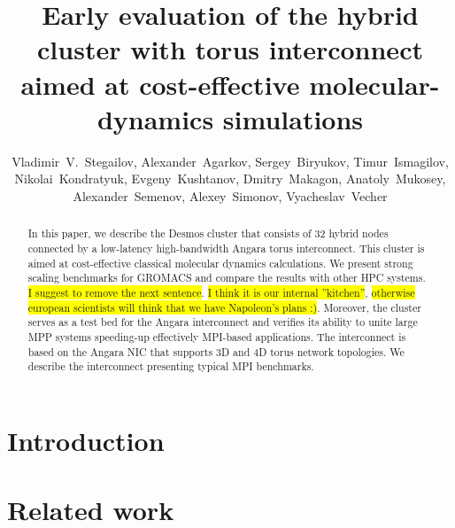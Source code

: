 \documentclass{llncs}
\begin{document}
\title{Early evaluation of the hybrid cluster with torus interconnect aimed at cost-effective molecular-dynamics simulations}

\author{%
Vladimir~V.~Stegailov,
Alexander~Agarkov,
Sergey~Biryukov,
Timur~Ismagilov,
Nikolai~Kondratyuk,
Evgeny~Kushtanov,
Dmitry~Makagon,
Anatoly~Mukosey,
Alexander~Semenov,
Alexey~Simonov,
Vyacheslav~Vecher
}
%
%

\maketitle

\begin{abstract}
In this paper, we describe the Desmos cluster that consists of 32 hybrid nodes connected by a low-latency high-bandwidth Angara torus interconnect. This cluster is aimed at cost-effective classical molecular dynamics calculations. We present strong scaling benchmarks for GROMACS and compare the results with other HPC systems. \colorbox{yellow}{I suggest to remove the next sentence}. \colorbox{yellow}{I think it is our internal ''kitchen''}, \colorbox{yellow}{otherwise european scientists will think that we have Napoleon's plans :)}. Moreover, the cluster serves as a test bed for the Angara interconnect and verifies its ability to unite large MPP systems speeding-up effectively MPI-based applications. The interconnect is based on the Angara NIC that supports 3D and 4D torus network topologies. We describe the interconnect presenting typical MPI benchmarks.  
\end{abstract}


\section{Introduction}


\section{Related work}
\end{document}
